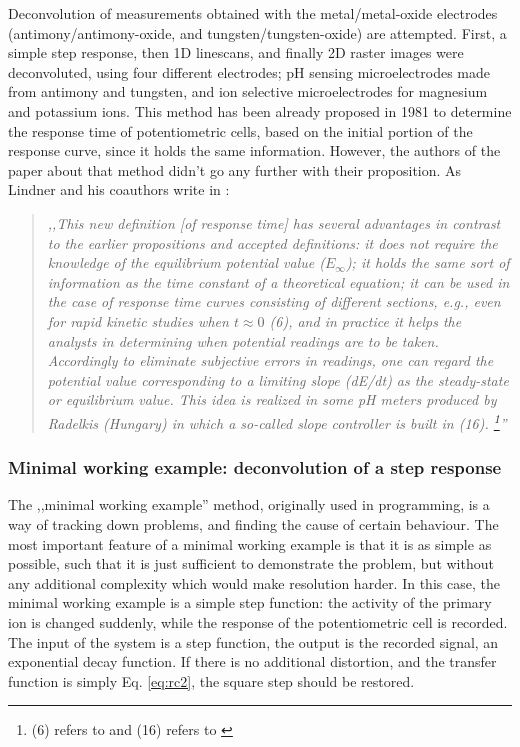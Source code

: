 Deconvolution of measurements obtained with the metal/metal-oxide electrodes (antimony/antimony-oxide, and tungsten/tungsten-oxide) are attempted.
First, a simple step response, then 1D linescans, and finally 2D raster images were deconvoluted, using four different electrodes; pH sensing microelectrodes made from antimony and tungsten, and ion selective microelectrodes for magnesium and potassium ions.
This method has been already proposed in 1981 to determine the response time of potentiometric cells, based on the initial portion of the response curve, since it holds the same information.
However, the authors of the paper about that method didn't go any further with their proposition.
As Lindner and his coauthors write in \cite{lindner1984definition}:

\begin{quote}
\vspace{0.5cm}
\emph{,,This new definition [of response time] has several advantages in contrast to the earlier propositions and accepted definitions: it does not require the knowledge of the equilibrium potential value ($E_{\infty}$); it holds the same sort of information as the time constant of a theoretical equation; it can be used in the case of response time curves consisting of different sections, e.g., even for rapid kinetic studies when $t \approx 0$ (6), and in practice it helps the analysts in determining when potential readings are to be taken.
Accordingly to eliminate subjective errors in readings, one can regard the potential value corresponding to a limiting slope (dE/dt) as the steady-state or equilibrium value.
This idea is realized in some pH meters produced by Radelkis (Hungary) in which a so-called slope controller is built in (16).
\footnote{(6) refers to \cite{lindner1982response} and (16) refers to \cite{havas1981}}''}
\vspace{0.5cm}
\end{quote}


			\subsubsection{Minimal working example: deconvolution of a step response}
The ,,minimal working example'' method, originally used in programming, is a way of tracking down problems, and finding the cause of certain behaviour.
The most important feature of a minimal working example is that it is as simple as possible, such that it is just sufficient to demonstrate the problem, but without any additional complexity which would make resolution harder.
In this case, the minimal working example is a simple step function: the activity of the primary ion is changed suddenly, while the response of the potentiometric cell is recorded.
The input of the system is a step function, the output is the recorded signal, an exponential decay function.
If there is no additional distortion, and the transfer function is simply Eq. \ref{eq:rc2}, the square step should be restored. 

